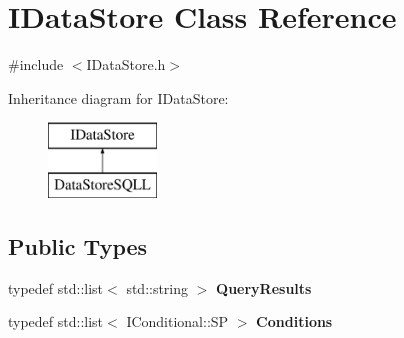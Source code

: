 \hypertarget{class_i_data_store}{}\section{I\+Data\+Store Class Reference}
\label{class_i_data_store}


{\ttfamily \#include $<$I\+Data\+Store.\+h$>$}

Inheritance diagram for I\+Data\+Store\+:\begin{figure}[H]
\begin{center}
\leavevmode
\includegraphics[height=2.000000cm]{class_i_data_store}
\end{center}
\end{figure}
\subsection*{Public Types}
\begin{DoxyCompactItemize}
\item 
\mbox{\label{class_i_data_store_a878f35148e64755c3e7983ce231af571}} 
typedef std\+::list$<$ std\+::string $>$ {\bfseries Query\+Results}
\item 
\mbox{\label{class_i_data_store_afde72b8330a555eae63a22c9e6305109}} 
typedef std\+::list$<$ I\+Conditional\+::\+SP $>$ {\bfseries Conditions}
\end{DoxyCompactItemize}
